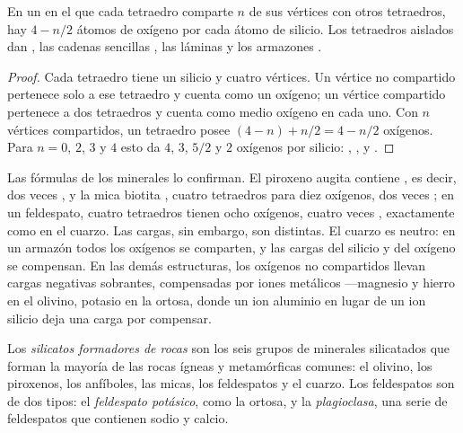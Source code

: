 
\begin{proposition}\label{prop:g11:minerals:sharing}
En un  en el que cada tetraedro comparte $n$ de sus vértices con otros
tetraedros, hay $4 - n/2$ átomos de oxígeno por cada átomo de silicio. Los
tetraedros aislados dan , las cadenas sencillas , las
láminas  y los armazones .
\end{proposition}

\begin{proof}
Cada tetraedro tiene un silicio y cuatro vértices. Un vértice no compartido
pertenece solo a ese tetraedro y cuenta como un oxígeno; un vértice compartido
pertenece a dos tetraedros y cuenta como medio oxígeno en cada uno. Con
$n$ vértices compartidos, un tetraedro posee $(4 - n) + n/2 = 4 - n/2$ oxígenos.
Para $n = 0$, $2$, $3$ y $4$ esto da $4$, $3$, $5/2$ y $2$ oxígenos
por silicio: , ,  y .
\end{proof}

Las fórmulas de los minerales lo confirman. El piroxeno augita contiene
, es decir, dos veces , y la mica biotita ,
cuatro tetraedros para diez oxígenos, dos veces ; en un feldespato,
cuatro tetraedros tienen ocho oxígenos, cuatro veces , exactamente
como en el cuarzo. Las cargas, sin embargo, son distintas. El cuarzo es
neutro: en un armazón todos los oxígenos se comparten, y las cargas del
silicio y del oxígeno se compensan. En las demás estructuras, los oxígenos no
compartidos llevan cargas negativas sobrantes, compensadas por iones
metálicos ---magnesio y hierro en el olivino, potasio en la ortosa, donde un
ion aluminio  en lugar de un ion silicio  deja una carga
por compensar.

\begin{definition}\label{def:g11:minerals:rock-forming}
Los \emph{silicatos formadores de rocas} son
los seis grupos de minerales silicatados que forman la mayoría de las rocas
ígneas y metamórficas comunes: el olivino, los piroxenos, los anfíboles, las
micas, los feldespatos y el cuarzo. Los feldespatos son de dos tipos: el
\emph{feldespato potásico}, como la ortosa, y la \emph{plagioclasa}, una serie
de feldespatos que contienen sodio y calcio.
\end{definition}

